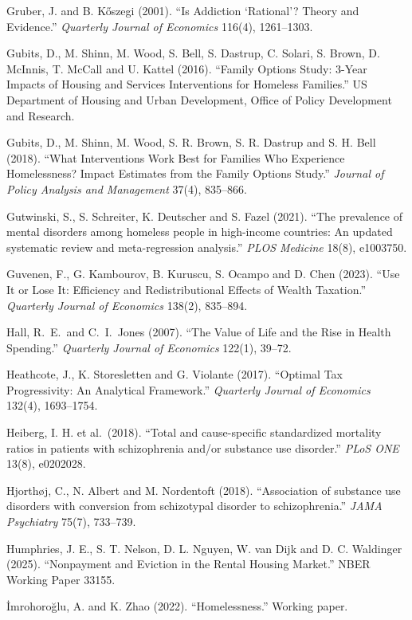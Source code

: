 \documentclass[10pt]{article}
\begin{document}
{\begin{list}{}{\setlength{\leftmargin}{1.5em}\setlength{\itemindent}{-1.5em}\setlength{\itemsep}{0.35em}\setlength{\parsep}{0em}}
\item Gruber, J. and B. K\H{o}szegi (2001). ``Is Addiction `Rational'? Theory and Evidence.'' \emph{Quarterly Journal of Economics} 116(4), 1261--1303.
\item Gubits, D., M. Shinn, M. Wood, S. Bell, S. Dastrup, C. Solari, S. Brown, D. McInnis, T. McCall and U. Kattel (2016). ``Family Options Study: 3-Year Impacts of Housing and Services Interventions for Homeless Families.'' US Department of Housing and Urban Development, Office of Policy Development and Research.
\item Gubits, D., M. Shinn, M. Wood, S. R. Brown, S. R. Dastrup and S. H. Bell (2018). ``What Interventions Work Best for Families Who Experience Homelessness? Impact Estimates from the Family Options Study.'' \emph{Journal of Policy Analysis and Management} 37(4), 835--866.
\item Gutwinski, S., S. Schreiter, K. Deutscher and S. Fazel (2021). ``The prevalence of mental disorders among homeless people in high-income countries: An updated systematic review and meta-regression analysis.'' \emph{PLOS Medicine} 18(8), e1003750.
\item Guvenen, F., G. Kambourov, B. Kuruscu, S. Ocampo and D. Chen (2023). ``Use It or Lose It: Efficiency and Redistributional Effects of Wealth Taxation.'' \emph{Quarterly Journal of Economics} 138(2), 835--894.
\item Hall, R.\ E.\ and C.\ I.\ Jones (2007). ``The Value of Life and the Rise in Health Spending.'' \emph{Quarterly Journal of Economics} 122(1), 39--72.
\item Heathcote, J., K. Storesletten and G. Violante (2017). ``Optimal Tax Progressivity: An Analytical Framework.'' \emph{Quarterly Journal of Economics} 132(4), 1693--1754.
\item Heiberg, I. H. et al.\ (2018). ``Total and cause-specific standardized mortality ratios in patients with schizophrenia and/or substance use disorder.'' \emph{PLoS ONE} 13(8), e0202028.
\item Hjorth\o j, C., N. Albert and M. Nordentoft (2018). ``Association of substance use disorders with conversion from schizotypal disorder to schizophrenia.'' \emph{JAMA Psychiatry} 75(7), 733--739.
\item Humphries, J. E., S. T. Nelson, D. L. Nguyen, W. van Dijk and D. C. Waldinger (2025). ``Nonpayment and Eviction in the Rental Housing Market.'' NBER Working Paper 33155.
\item \.{I}mrohoro\u{g}lu, A. and K. Zhao (2022). ``Homelessness.'' Working paper.

\end{list}}
\end{document}

